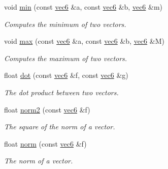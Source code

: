 \begin{DoxyCompactItemize}
void \hyperlink{namespacephysim_1_1math_a863a43b7b02745aeda968023f961f3f0}{min} (const \hyperlink{structphysim_1_1math_1_1vec6}{vec6} \&a, const \hyperlink{structphysim_1_1math_1_1vec6}{vec6} \&b, \hyperlink{structphysim_1_1math_1_1vec6}{vec6} \&m)
\begin{DoxyCompactList}\small\item\em Computes the minimum of two vectors. \end{DoxyCompactList}\item 
void \hyperlink{namespacephysim_1_1math_aef66973aaf17e34ce0b033a67c201662}{max} (const \hyperlink{structphysim_1_1math_1_1vec6}{vec6} \&a, const \hyperlink{structphysim_1_1math_1_1vec6}{vec6} \&b, \hyperlink{structphysim_1_1math_1_1vec6}{vec6} \&M)
\begin{DoxyCompactList}\small\item\em Computes the maximum of two vectors. \end{DoxyCompactList}\item 
\mbox{\label{namespacephysim_1_1math_a14d567a123df9f67a1cfe39a4b1d1d0c}} 
float \hyperlink{namespacephysim_1_1math_a14d567a123df9f67a1cfe39a4b1d1d0c}{dot} (const \hyperlink{structphysim_1_1math_1_1vec6}{vec6} \&f, const \hyperlink{structphysim_1_1math_1_1vec6}{vec6} \&g)
\begin{DoxyCompactList}\small\item\em The dot product between two vectors. \end{DoxyCompactList}\item 
\mbox{\label{namespacephysim_1_1math_a6670150aeb429958e0ebe24638fc8eb8}} 
float \hyperlink{namespacephysim_1_1math_a6670150aeb429958e0ebe24638fc8eb8}{norm2} (const \hyperlink{structphysim_1_1math_1_1vec6}{vec6} \&f)
\begin{DoxyCompactList}\small\item\em The square of the norm of a vector. \end{DoxyCompactList}\item 
\mbox{\label{namespacephysim_1_1math_a4448e3d1fa7426900fbe4289e740dc85}} 
float \hyperlink{namespacephysim_1_1math_a4448e3d1fa7426900fbe4289e740dc85}{norm} (const \hyperlink{structphysim_1_1math_1_1vec6}{vec6} \&f)
\begin{DoxyCompactList}\small\item\em The norm of a vector. \end{DoxyCompactList}\item 

\end{DoxyCompactItemize}
